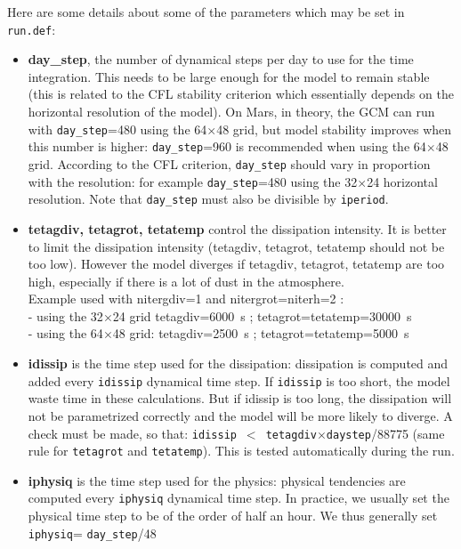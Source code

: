 \noindent Here are some details about some of the parameters which may be
set in {\tt run.def}:
\begin{itemize}
\item {\bf day\_step}, the number of dynamical steps per day to use for
the time integration. This needs to be large enough for the model
to remain stable (this is related to the CFL stability criterion
which essentially depends on the horizontal resolution of the model).
On Mars, in theory, the GCM can run with
{\tt day\_step}=480 using the 64$\times$48 grid, but model stability
improves when this number is higher: {\tt day\_step}=960 is recommended
 when using the 64$\times$48 grid. According to the CFL criterion,
{\tt day\_step} should vary in proportion with the resolution: for example
{\tt day\_step}=480 using the 32$\times$24 horizontal resolution.
Note that {\tt day\_step} must also be divisible by {\tt iperiod}.

\item {\bf tetagdiv, tetagrot, tetatemp} control the dissipation intensity.
It is better to limit the dissipation intensity
(tetagdiv, tetagrot, tetatemp should not be too low).
However the model diverges if tetagdiv, tetagrot, tetatemp are too high,
especially if there is a lot of dust in the atmosphere. \\
Example used with nitergdiv=1 and  nitergrot=niterh=2 : \\
- using the 32$\times$24 grid tetagdiv=6000~s ; tetagrot=tetatemp=30000~s \\
- using the 64$\times$48 grid: tetagdiv=2500~s ; tetagrot=tetatemp=5000~s

\item {\bf idissip} is the time step used for the dissipation:
dissipation is computed and added every {\tt idissip} dynamical
time step. If {\tt idissip} is
too short, the model waste time in these calculations. But if idissip is too
long, the  dissipation will not be parametrized correctly and the  model will
be more likely to diverge. 
A check must be made, so that:
{\tt idissip}~$<$~{\tt tetagdiv}$\times${\tt daystep}/88775
(same rule for {\tt tetagrot} and {\tt tetatemp}).
This is tested automatically during the run.

\item {\bf iphysiq} is the time step used for the physics:
physical tendencies are computed every {\tt iphysiq} dynamical time step.
In practice, we
usually set the physical time step to be of the order of half an hour. 
We thus generally set {\tt iphysiq}= {\tt day\_step}/48

\end{itemize}

